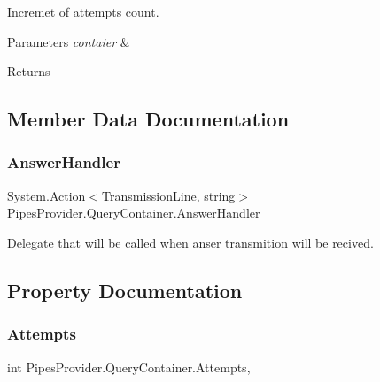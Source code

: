 Incremet of attempts count. 


\begin{DoxyParams}{Parameters}
{\em contaier} & \\
\hline
\end{DoxyParams}
\begin{DoxyReturn}{Returns}

\end{DoxyReturn}


\subsection{Member Data Documentation}
\mbox{\label{struct_pipes_provider_1_1_query_container_aa04364ca7f1fc51a91671d1d74b8d810}} 
\subsubsection{\texorpdfstring{Answer\+Handler}{AnswerHandler}}
{\footnotesize\ttfamily System.\+Action$<$\mbox{\hyperlink{class_pipes_provider_1_1_transmission_line}{Transmission\+Line}}, string$>$ Pipes\+Provider.\+Query\+Container.\+Answer\+Handler}



Delegate that will be called when anser transmition will be recived. 



\subsection{Property Documentation}
\mbox{\label{struct_pipes_provider_1_1_query_container_aaeb530fcd4fde620a6f32343dcecfc4b}} 
\subsubsection{\texorpdfstring{Attempts}{Attempts}}
{\footnotesize\ttfamily int Pipes\+Provider.\+Query\+Container.\+Attempts\hspace{0.3cm}{\ttfamily [get]}, {}}




